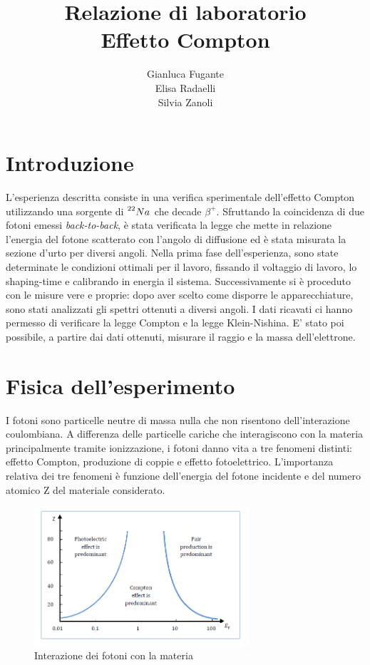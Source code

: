\documentclass[italian,11pt]{report}
\author{Gianluca Fugante\\ Elisa Radaelli\\ Silvia Zanoli}
\title{ Relazione di laboratorio\\ Effetto Compton}
\begin{document}
\maketitle	
\tableofcontents

\chapter*{Introduzione}

L’esperienza descritta consiste in una verifica sperimentale dell’effetto
Compton utilizzando una sorgente di $\prescript{22}{}{Na}_{}^{}$ che decade $\beta^{+}$. Sfruttando la coincidenza di due fotoni emessi \textit{back-to-back}, è stata verificata la legge che mette in relazione l'energia del fotone scatterato con l'angolo di diffusione ed è stata misurata la sezione d'urto per diversi angoli. Nella prima fase dell'esperienza, sono state determinate le condizioni ottimali per il lavoro, fissando il voltaggio di lavoro, lo shaping-time e calibrando in energia il sistema. Successivamente si è proceduto con le misure vere e proprie: dopo aver scelto come disporre le apparecchiature, sono stati analizzati gli spettri ottenuti a diversi angoli. I dati ricavati ci hanno permesso di verificare la legge Compton e la legge Klein-Nishina. E' stato poi possibile, a partire dai dati ottenuti, misurare il raggio e la massa dell'elettrone.

\chapter{Fisica dell'esperimento}




I fotoni sono particelle neutre di massa nulla che non risentono dell’interazione coulombiana. A differenza delle particelle cariche che interagiscono con la materia principalmente tramite ionizzazione, i fotoni danno vita a tre fenomeni distinti: effetto Compton, produzione di coppie e effetto fotoelettrico. L’importanza relativa dei tre fenomeni è funzione dell’energia del fotone incidente e del numero atomico Z del materiale considerato.  

\vspace{5mm}


\begin{figure}[htp]
\centering
\includegraphics[width=8cm]{cattura46.png}
\caption{Interazione dei fotoni con la materia}
\end{figure}
\end{document}
